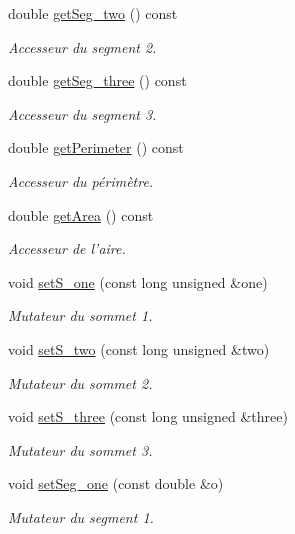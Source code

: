 \begin{DoxyCompactItemize}
double \hyperlink{class_face_a50a58b3b43a78239defee57e7202968e}{get\-Seg\-\_\-two} () const 
\begin{DoxyCompactList}\small\item\em Accesseur du segment 2. \end{DoxyCompactList}\item 
double \hyperlink{class_face_a19bb64415987240d90a1ec86d2432f05}{get\-Seg\-\_\-three} () const 
\begin{DoxyCompactList}\small\item\em Accesseur du segment 3. \end{DoxyCompactList}\item 
double \hyperlink{class_face_acd3e36c17c14b6617d92b0b9ecb2b6fc}{get\-Perimeter} () const 
\begin{DoxyCompactList}\small\item\em Accesseur du périmètre. \end{DoxyCompactList}\item 
double \hyperlink{class_face_a58beb8ce1b9f8154379db998a02ffa3d}{get\-Area} () const 
\begin{DoxyCompactList}\small\item\em Accesseur de l'aire. \end{DoxyCompactList}\item 
void \hyperlink{class_face_a7cf9a6444c016facc8af680307dc32f8}{set\-S\-\_\-one} (const long unsigned \&one)
\begin{DoxyCompactList}\small\item\em Mutateur du sommet 1. \end{DoxyCompactList}\item 
void \hyperlink{class_face_a57a8fa516fc695417ac9c4a051ee1d00}{set\-S\-\_\-two} (const long unsigned \&two)
\begin{DoxyCompactList}\small\item\em Mutateur du sommet 2. \end{DoxyCompactList}\item 
void \hyperlink{class_face_a5002bd6378f4d9ca38ae1aaf9e64bc03}{set\-S\-\_\-three} (const long unsigned \&three)
\begin{DoxyCompactList}\small\item\em Mutateur du sommet 3. \end{DoxyCompactList}\item 
void \hyperlink{class_face_a467b326e9be6b5aac350c9b87a5ab14c}{set\-Seg\-\_\-one} (const double \&o)
\begin{DoxyCompactList}\small\item\em Mutateur du segment 1. \end{DoxyCompactList}\item 

\end{DoxyCompactItemize}
